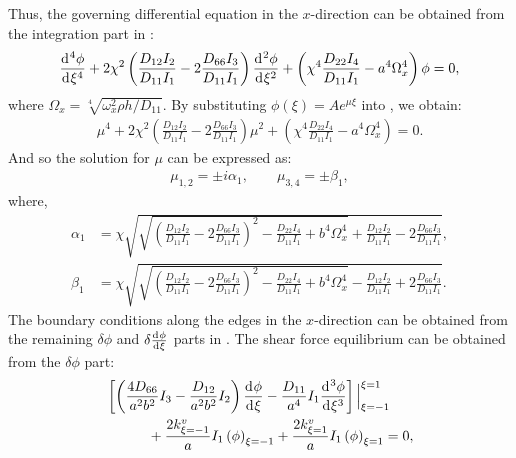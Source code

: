\documentclass[preprint,12pt,number]{elsarticle}
\newcommand{\id}{\mathrm{d}\mkern1mu}
\begin{document}
%
Thus, the governing differential equation in the $ x $-direction can be obtained from the integration part in :
%
\begin{equation}\label{eq:ODEx}
\frac{\id^4 \phi}{\id \xi^4}+ 2\chi^2\left(\frac{D_{12}I_2}{D_{11}I_1}-2\frac{D_{66}I_3}{D_{11}I_1}\right)\frac{\id^2 \phi}{\id \xi^2}+\left(\chi^4\frac{D_{22}I_4}{D_{11}I_1}-a^4\Omega_x^4\right)\phi=0,
\end{equation}
%
where $\Omega_x = \sqrt[4]{\omega_x^2 \rho h / D_{11}}$.
By substituting $\phi(\xi) = A e^{\mu \xi}$ into , we obtain:
%
\begin{equation}\label{eq:ODEx2}
\begin{split}
	\mu^4 + 2\chi^2\left(\frac{D_{12}I_2}{D_{11}I_1}-2\frac{D_{66}I_3}{D_{11}I_1}\right)\mu^2 + \left(\chi^4\frac{D_{22}I_4}{D_{11}I_1}-a^4\Omega_x^4\right) = 0.
\end{split}
\end{equation}
%
And so the solution for $\mu$ can be expressed as:
%
\begin{equation}\label{eq:mu}
\begin{split}
	\mu_{1,2} = \pm\textit{i} \alpha_1, \qquad \mu_{3,4} = \pm \beta_1,
\end{split}
\end{equation}
%
where,
%
\begin{subequations}\label{eq:alphax}
\begin{align}
	\alpha_1 &= \chi \sqrt{\sqrt{\left(\frac{D_{12}I_2}{D_{11}I_1}-2\frac{D_{66}I_3}{D_{11}I_1}\right)^2 - \frac{D_{22}I_4}{D_{11}I_1} + b^4\Omega_x^4} + \frac{D_{12}I_2}{D_{11}I_1} - 2\frac{D_{66}I_3}{D_{11}I_1}},\label{eq:alphax1}\\
	\beta_1 &= \chi \sqrt{\sqrt{\left(\frac{D_{12}I_2}{D_{11}I_1}-2\frac{D_{66}I_3}{D_{11}I_1}\right)^2 - \frac{D_{22}I_4}{D_{11}I_1} + b^4\Omega_x^4} - \frac{D_{12}I_2}{D_{11}I_1} + 2\frac{D_{66}I_3}{D_{11}I_1}}.\label{eq:alphax2}
\end{align}
\end{subequations}
%
The boundary conditions along the edges in the $x$-direction can be obtained from the remaining $\delta \phi$ and $\delta \frac{\id \phi}{\id \xi}$ parts in . 
The shear force equilibrium can be obtained from the $\delta \phi$ part:
%
\begin{equation}\label{eq:inertial_forcex}
\begin{split}
	&\left[ \left( \frac{4D_{66}}{a^2b^2} I_3 - \frac{D_{12}}{a^2b^2} I_2 \right) \frac{\id \phi}{\id \xi} 
	- \frac{D_{11}}{a^4} I_1 \frac{\id^3 \phi}{\id \xi^3} \right] \Big|^{\xi=1}_{\xi=-1}\\
	&\quad\qquad+ \frac{2k^v_{\xi=-1}}{a} I_1 \left(\phi\right)_{\xi=-1}
	+ \frac{2k^v_{\xi=1}}{a} I_1 \left(\phi\right)_{\xi=1} = 0,
\end{split}
\end{equation}
\end{document}
